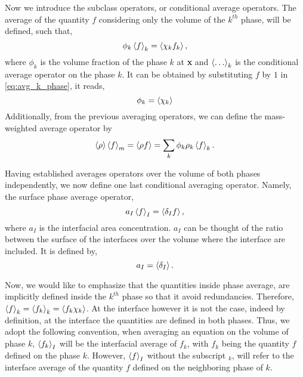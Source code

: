 Now we introduce the subclass operators, or conditional average operators.
The average of the quantity $f$ considering only the volume of the $k^{th}$ phase, will be defined, such that, 
\begin{equation}
    \phi_k \left<f\right>_k 
    = \left<\chi_k f_k\right>,
    \label{eq:avg_k_phase}
\end{equation}
where $\phi_k$ is the volume fraction of the phase $k$ at \textbf{x} and $\left<\ldots\right>_k$ is the conditional average operator on the phase $k$.
It can be obtained by substituting $f$ by $1$ in \ref{eq:avg_k_phase}, it reads,
\begin{equation*}
    \phi_k  
    = \left<\chi_k\right>
\end{equation*}
Additionally, from the previous averaging operators, we can define the mass-weighted average operator by
\begin{equation}
    \left<\rho\right> \left<f\right>_m 
    = \left<\rho f\right>
    = \sum_k \phi_k \rho_k\left<f\right>_k.
\end{equation}

Having established averages operators over the volume of both phases independently, we now define one last conditional averaging operator.
Namely, the surface phase average operator,  
\begin{equation}
    a_I\left<f\right>_I 
    = \left<\delta_I f\right>,
    \label{eq:avg_I_phase}
\end{equation}
where $a_I$ is the interfacial area concentration.  
$a_I$ can be thought of the ratio between the surface of the interfaces over the volume where the interface are included. 
It is defined by, 
\begin{equation}
    a_I
    = \left<\delta_I\right>.
\end{equation}

Now, we would like to emphasize that the quantities inside phase average, are implicitly defined inside the $k^{th}$ phase so that it avoid redundancies. 
Therefore, $\left<f\right>_k = \left<f_k\right>_k= \left<f_k\chi_k\right>$.
At the interface however it is not the case, indeed by definition, at the interface the quantities are defined in both phases.
Thus, we adopt the following convention, when averaging an equation on the volume of phase $k$, $\left<f_k\right>_I$ will be the interfacial average of $f_k$, with $f_k$ being the quantity $f$ defined on the phase $k$. 
However, $\left<f\right>_I$ without the subscript $_k$, will refer to the interface average of the quantity $f$ defined on the neighboring phase of $k$. 

